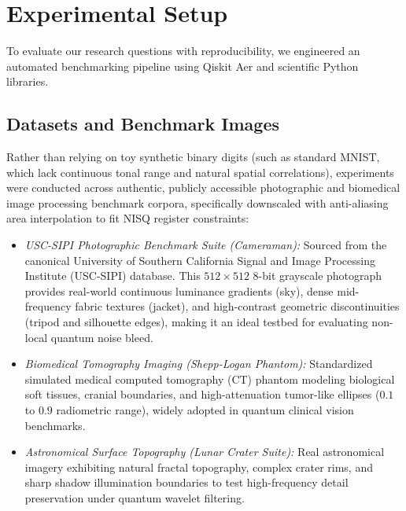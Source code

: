\documentclass[12pt,onecolumn,draftclsnofoot]{IEEEtran}
\begin{document}
\section{Experimental Setup}
To evaluate our research questions with reproducibility, we engineered an automated benchmarking pipeline using Qiskit Aer and scientific Python libraries.

\subsection{Datasets and Benchmark Images}
Rather than relying on toy synthetic binary digits (such as standard MNIST, which lack continuous tonal range and natural spatial correlations), experiments were conducted across authentic, publicly accessible photographic and biomedical image processing benchmark corpora, specifically downscaled with anti-aliasing area interpolation to fit NISQ register constraints:
\begin{itemize}
    \item \textit{USC-SIPI Photographic Benchmark Suite (Cameraman):} Sourced from the canonical University of Southern California Signal and Image Processing Institute (USC-SIPI) database. This $512 \times 512$ 8-bit grayscale photograph provides real-world continuous luminance gradients (sky), dense mid-frequency fabric textures (jacket), and high-contrast geometric discontinuities (tripod and silhouette edges), making it an ideal testbed for evaluating non-local quantum noise bleed.
    \item \textit{Biomedical Tomography Imaging (Shepp-Logan Phantom):} Standardized simulated medical computed tomography (CT) phantom modeling biological soft tissues, cranial boundaries, and high-attenuation tumor-like ellipses ($0.1$ to $0.9$ radiometric range), widely adopted in quantum clinical vision benchmarks.
    \item \textit{Astronomical Surface Topography (Lunar Crater Suite):} Real astronomical imagery exhibiting natural fractal topography, complex crater rims, and sharp shadow illumination boundaries to test high-frequency detail preservation under quantum wavelet filtering.
\end{itemize}
\end{document}
